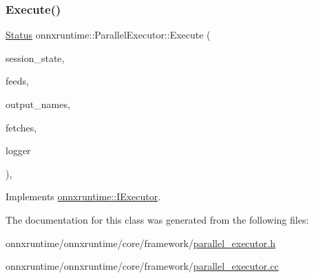 \subsubsection{\texorpdfstring{Execute()}{Execute()}}
{\footnotesize\ttfamily \mbox{\hyperlink{classonnxruntime_1_1common_1_1Status}{Status}} onnxruntime\+::\+Parallel\+Executor\+::\+Execute (\begin{DoxyParamCaption}\item[{const \mbox{\hyperlink{classonnxruntime_1_1SessionState}{Session\+State}} \&}]{session\+\_\+state,  }\item[{const \mbox{\hyperlink{namespaceonnxruntime_a48b01f0410ec8d693dbd40d1132bd66c}{Name\+M\+L\+Val\+Map}} \&}]{feeds,  }\item[{const std\+::vector$<$ std\+::string $>$ \&}]{output\+\_\+names,  }\item[{std\+::vector$<$ \mbox{\hyperlink{classonnxruntime_1_1MLValue}{M\+L\+Value}} $>$ \&}]{fetches,  }\item[{const \mbox{\hyperlink{classonnxruntime_1_1logging_1_1Logger}{logging\+::\+Logger}} \&}]{logger }\end{DoxyParamCaption})\hspace{0.3cm}{\ttfamily [override]}, {\ttfamily [virtual]}}



Implements \mbox{\hyperlink{classonnxruntime_1_1IExecutor_a72794c9d86c407a835858c739ac4fb3e}{onnxruntime\+::\+I\+Executor}}.



The documentation for this class was generated from the following files\+:\begin{DoxyCompactItemize}
\item 
onnxruntime/onnxruntime/core/framework/\mbox{\hyperlink{parallel__executor_8h}{parallel\+\_\+executor.\+h}}\item 
onnxruntime/onnxruntime/core/framework/\mbox{\hyperlink{parallel__executor_8cc}{parallel\+\_\+executor.\+cc}}\end{DoxyCompactItemize}
